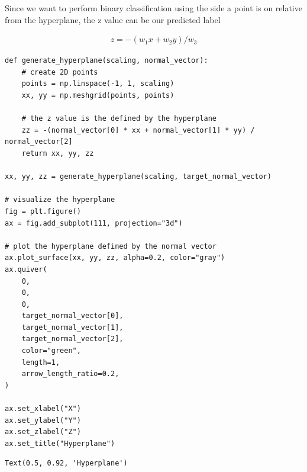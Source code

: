 \documentclass[openany]{book}
\makeatletter
\newcommand{\boxspacing}{\kern\kvtcb@left@rule\kern\kvtcb@boxsep}
\newcommand{\prompt}[4]{
        {\ttfamily\llap{{\color{#2}[#3]:\hspace{3pt}#4}}\vspace{-\baselineskip}}
    }
\makeatother
\begin{document}
Since we want to perform binary classification using the side a point is
on relative from the hyperplane, the z value can be our predicted label

\begin{align*}
z = -(w_1 x + w_2 y) / w_3
\end{align*}

\begin{tcolorbox}
\tiny
\begin{verbatim}
def generate_hyperplane(scaling, normal_vector):
    # create 2D points
    points = np.linspace(-1, 1, scaling)
    xx, yy = np.meshgrid(points, points)

    # the z value is the defined by the hyperplane
    zz = -(normal_vector[0] * xx + normal_vector[1] * yy) / normal_vector[2]
    return xx, yy, zz

xx, yy, zz = generate_hyperplane(scaling, target_normal_vector)

# visualize the hyperplane
fig = plt.figure()
ax = fig.add_subplot(111, projection="3d")

# plot the hyperplane defined by the normal vector
ax.plot_surface(xx, yy, zz, alpha=0.2, color="gray")
ax.quiver(
    0,
    0,
    0,
    target_normal_vector[0],
    target_normal_vector[1],
    target_normal_vector[2],
    color="green",
    length=1,
    arrow_length_ratio=0.2,
)

ax.set_xlabel("X")
ax.set_ylabel("Y")
ax.set_zlabel("Z")
ax.set_title("Hyperplane")
\end{verbatim}
\end{tcolorbox}

            \begin{tcolorbox}[breakable, size=fbox, boxrule=.5pt, pad at break*=1mm, opacityfill=0]
\prompt{Out}{outcolor}{3}{\boxspacing}
\begin{Verbatim}[commandchars=\\\{\}]
Text(0.5, 0.92, 'Hyperplane')
\end{Verbatim}
\end{tcolorbox}
        
\end{document}
